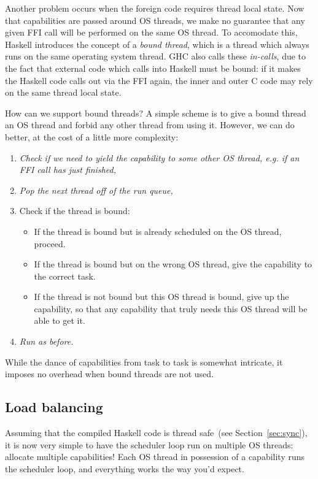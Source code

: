 Another problem occurs when the foreign code requires thread local
state.  Now that capabilities are passed around OS threads, we make no
guarantee that any given FFI call will be performed on the same OS
thread.  To accomodate this, Haskell introduces the concept of a
\emph{bound thread}, which is a thread which always runs on the same
operating system thread.  GHC also calls these \emph{in-calls}, due to
the fact that external code which calls into Haskell must be bound: if
it makes the Haskell code calls out via the FFI again, the inner and
outer C code may rely on the same thread local state.

How can we support bound threads?  A simple scheme is to give a bound thread
an OS thread and forbid any other thread from using it. However, we can
do better, at the cost of a little more complexity:

\begin{enumerate}
    \item \emph{Check if we need to yield the capability to some other OS thread, e.g. if an FFI call has just finished,}
    \item \emph{Pop the next thread off of the run queue,}
    \item Check if the thread is bound:
        \begin{itemize}
            \item If the thread is bound but is already scheduled on the OS thread, proceed.
            \item If the thread is bound but on the wrong OS thread, give the capability to the correct task.
            \item If the thread is not bound but this OS thread is bound, give up the capability, so that any capability that truly needs this OS thread will be able to get it.
        \end{itemize}
    \item \emph{Run as before.}
\end{enumerate}

While the dance of capabilities from task to task is somewhat intricate,
it imposes no overhead when bound threads are not used.

\subsection{Load balancing}

Assuming that the compiled Haskell code is thread safe~(see Section~\ref{sec:sync}), it is now
very simple to have the scheduler loop run on multiple OS threads:
allocate multiple capabilities!  Each OS thread in possession of a capability
runs the scheduler loop, and everything works the way you'd expect.

